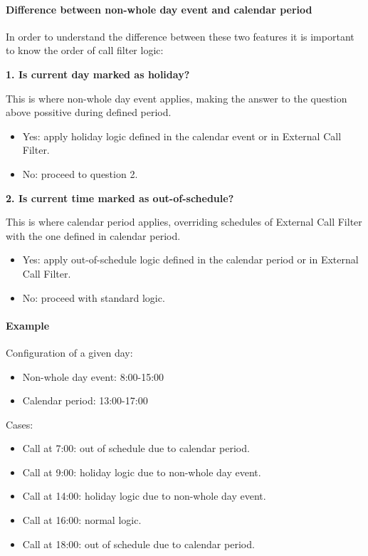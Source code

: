 \documentclass[letterpaper,10pt,english]{sphinxmanual}
\begin{document}
\paragraph{Difference between non-whole day event and calendar period}
\label{administration_portal/client/vpbx/routing_tools/calendars:difference-between-non-whole-day-event-and-calendar-period}
In order to understand the difference between these two features it is important to know the order of call filter logic:

\textbf{1. Is current day marked as holiday?}

This is where non-whole day event applies, making the answer to the question above possitive during defined period.
\begin{itemize}
\item {} 
Yes: apply holiday logic defined in the calendar event or in External Call Filter.

\item {} 
No: proceed to question 2.

\end{itemize}

\textbf{2. Is current time marked as out-of-schedule?}

This is where calendar period applies, overriding schedules of External Call Filter with the one defined in calendar
period.
\begin{itemize}
\item {} 
Yes: apply out-of-schedule logic defined in the calendar period or in External Call Filter.

\item {} 
No: proceed with standard logic.

\end{itemize}
\paragraph{Example}

Configuration of a given day:
\begin{itemize}
\item {} 
Non-whole day event: 8:00-15:00

\item {} 
Calendar period: 13:00-17:00

\end{itemize}

Cases:
\begin{itemize}
\item {} 
Call at 7:00: out of schedule due to calendar period.

\item {} 
Call at 9:00: holiday logic due to non-whole day event.

\item {} 
Call at 14:00: holiday logic due to non-whole day event.

\item {} 
Call at 16:00: normal logic.

\item {} 
Call at 18:00: out of schedule due to calendar period.

\end{itemize}
\end{document}
